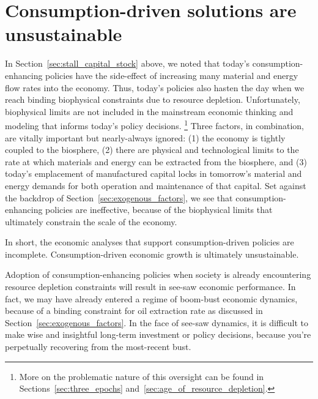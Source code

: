 

\section{Consumption-driven solutions are unsustainable}
\label{sec:consumption_unsustainable}

In Section~\ref{sec:stall_capital_stock} above, 
we noted that today's consumption-enhancing policies have the side-effect of
increasing many material and energy flow rates into the economy.
Thus, today's policies also
hasten the day when we reach binding biophysical constraints
due to resource depletion. 
Unfortunately, biophysical limits 
are not included in the mainstream economic thinking and modeling
that informs today's policy decisions.%
	\footnote{
	More on the problematic nature of this oversight
	can be found in Sections~\ref{sec:three_epochs} and~\ref{sec:age_of_resource_depletion}.
	}
Three factors, in combination, are vitally important 
but nearly-always ignored: 
(1) the economy is tightly coupled to the biosphere, 
(2) there are physical and technological limits 
	to the rate at which materials and energy can be extracted 
	from the biosphere, and 
(3) today's emplacement of manufactured capital locks in
	tomorrow's material and energy demands 
	for both operation and maintenance of that capital.
Set against the backdrop of Section~\ref{sec:exogenous_factors},
we see that consumption-enhancing policies are ineffective,
because of the biophysical limits that ultimately constrain the scale of the economy. 

In short, the economic analyses that support 
consumption-driven policies are incomplete.
Consumption-driven economic growth is ultimately unsustainable.

Adoption of consumption-enhancing policies when society is already encountering
resource depletion constraints
will result in see-saw economic performance. 
In fact, we may have already entered a regime of boom-bust economic dynamics,
because of a binding constraint for oil extraction rate
as discussed in Section~\ref{sec:exogenous_factors}.
In the face of see-saw dynamics,
it is difficult to make wise and insightful long-term investment or policy decisions,
because you're perpetually recovering from the most-recent bust.

